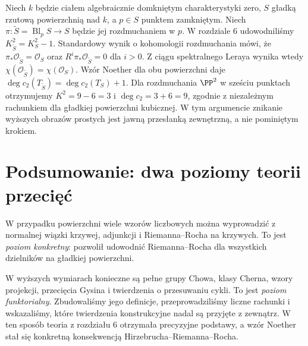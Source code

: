 \begin{przyklad}
\label{prz:ga7-blowup-c2}
Niech $k$ będzie ciałem algebraicznie domkniętym
charakterystyki zero, $S$ gładką rzutową powierzchnią
nad $k$, a $p\in S$ punktem zamkniętym.
Niech $\pi:\widetilde S=\operatorname{Bl}_pS\to S$
będzie jej rozdmuchaniem w $p$.
W rozdziale 6 udowodniliśmy
$K_{\widetilde S}^2=K_S^2-1$.
Standardowy wynik o kohomologii rozdmuchania mówi, że
$\pi_*\mathcal O_{\widetilde S}=\mathcal O_S$ oraz
$R^i\pi_*\mathcal O_{\widetilde S}=0$ dla $i>0$.
Z ciągu spektralnego Leraya wynika wtedy
$\chi(\mathcal O_{\widetilde S})=\chi(\mathcal O_S)$.
Wzór Noether dla obu powierzchni daje
$\deg c_2(T_{\widetilde S})=\deg c_2(T_S)+1$.
Dla rozdmuchania $\PP^2$ w sześciu punktach otrzymujemy
$K^2=9-6=3$ i $\deg c_2=3+6=9$, zgodnie
z niezależnym rachunkiem dla gładkiej powierzchni kubicznej.
W tym argumencie znikanie wyższych obrazów prostych
jest jawną przesłanką zewnętrzną, a nie pominiętym krokiem.
\end{przyklad}

\section{Podsumowanie: dwa poziomy teorii przecięć}
\label{sec:ga7-summary}

W przypadku powierzchni wiele wzorów liczbowych można
wyprowadzić z normalnej wiązki krzywej, adjunkcji
i Riemanna--Rocha na krzywych. To jest \emph{poziom
konkretny}: pozwolił udowodnić Riemanna--Rocha dla
wszystkich dzielników na gładkiej powierzchni.

W wyższych wymiarach konieczne są pełne grupy Chowa,
klasy Cherna, wzory projekcji, przecięcia Gysina
i twierdzenia o przesuwaniu cykli. To jest
\emph{poziom funktorialny}. Zbudowaliśmy jego definicje,
przeprowadziliśmy liczne rachunki i wskazaliśmy,
które twierdzenia konstrukcyjne nadal są przyjęte
z zewnątrz. W ten sposób teoria z rozdziału 6
otrzymała precyzyjne podstawy, a wzór Noether
stał się konkretną konsekwencją
Hirzebrucha--Riemanna--Rocha.

